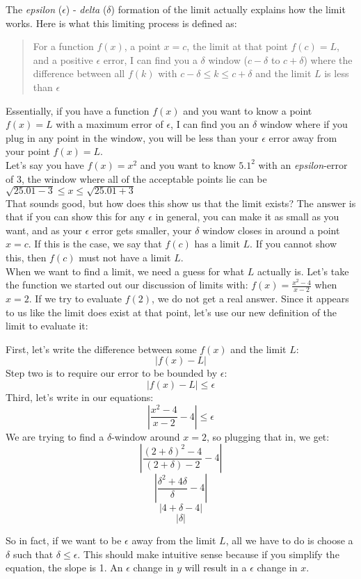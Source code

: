 \documentclass[../revisedmain.tex]{subfiles}
\begin{document}
	The \textit{epsilon} ($\epsilon$) - \textit{delta} ($\delta$) formation of the limit actually explains how the limit works. Here is what this limiting process is defined as:
	\begin{quote}
		For a function $f(x)$, a point $x=c$, the limit at that point $f(c)=L$, and a positive $\epsilon$ error, I can find you a $\delta$ window ($c-\delta$ to $c+\delta$) where the difference between all $f(k)$ with $c-\delta\le k\le c+\delta$ and the limit $L$ is less than $\epsilon$
	\end{quote}
	Essentially, if you have a function $f(x)$ and you want to know a point $f(x)=L$ with a maximum error of $\epsilon$, I can find you an $\delta$ window where if you plug in any point in the window, you will be less than your $\epsilon$ error away from your point $f(x)=L$.\\
	Let's say you have $f(x)=x^2$ and you want to know $5.1^2$ with an \textit{epsilon}-error of 3, the window where all of the acceptable points lie can be $\sqrt{25.01-3}\le x\le\sqrt{25.01+3}$\\\newline
	That sounds good, but how does this show us that the limit exists? The answer is that if you can show this for any $\epsilon$ in general, you can make it as small as you want, and as your $\epsilon$ error gets smaller, your $\delta$ window closes in around a point $x=c$. If this is the case, we say that $f(c)$ has a limit $L$. If you cannot show this, then $f(c)$ must not have a limit $L$.\\\newline
	When we want to find a limit, we need a guess for what $L$ actually is. Let's take the function we started out our discussion of limits with: $f(x)=\displaystyle\frac{x^2-4}{x-2}$ when $x=2$. If we try to evaluate $f(2)$, we do not get a real answer. Since it appears to us like the limit does exist at that point, let's use our new definition of the limit to evaluate it:
	\begin{center}
		First, let's write the difference between some $f(x)$ and the limit $L$:
		$$|f(x)-L|$$
		Step two is to require our error to be bounded by $\epsilon$:
		$$|f(x)-L|\le\epsilon$$
		Third, let's write in our equations:
		$$\left|\frac{x^2-4}{x-2}-4\right|\le\epsilon$$
		We are trying to find a $\delta$-window around $x=2$, so plugging that in, we get:
		$$\left|\frac{(2+\delta)^2-4}{(2+\delta)-2}-4\right|$$
		$$\left|\frac{\delta^2+4\delta}{\delta}-4\right|$$
		$$\left|4+\delta-4\right|$$
		$$\left|\delta\right|$$
		\end{center}
	So in fact, if we want to be $\epsilon$ away from the limit $L$, all we have to do is choose a $\delta$ such that $\delta\le\epsilon$. This should make intuitive sense because if you simplify the equation, the slope is 1. An $\epsilon$ change in $y$ will result in a $\epsilon$ change in $x$.
\end{document}
